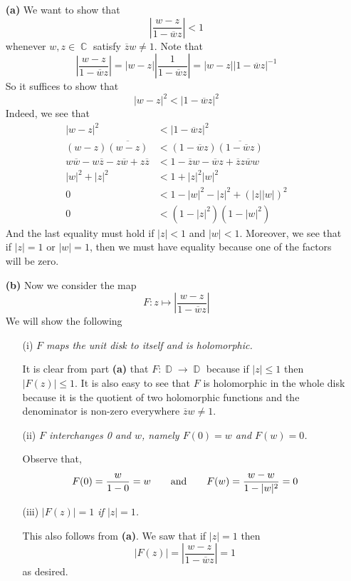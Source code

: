 \documentclass{article}
\newcommand{\tab}{\hspace*{2em}}
\DeclareMathOperator{\C}{\mathbb{C}}
\DeclareMathOperator{\D}{\mathbb{D}}
\newcommand{\exercise}[1]{\noindent{\textbf{Exercise #1:}}}
\newcommand{\conj}[1]{\overline{#1}}
\begin{document}
\exercise{1.4.7}
\begin{enumerate}
\item[\textbf{(a)}] We want to show that
  \[
  \left|\frac{w-z}{1-\conj{w}z}\right| < 1
  \]
  whenever $w,z \in \C$ satisfy $\conj{z}w \neq 1$. Note that
  \[
  \left|\frac{w-z}{1-\conj{w}z}\right| =
  |w-z|\left|\frac{1}{1-\conj{w}z}\right| = |w-z||1-\conj{w}z|^{-1}
  \]
  So it suffices to show that
  \[
  |w-z|^2 < |1-\conj{w}z|^2
  \]
  Indeed, we see that
  \begin{align*}
    |w-z|^2 &< |1-\conj{w}z|^2 \\
    (w-z)\conj{(w-z)} &< (1-\conj{w}z)\conj{(1-\conj{w}z)} \\
    w\conj{w}-w\conj{z}-z\conj{w} + z\conj{z} &<
    1-\conj{z}w-\conj{w}z+\conj{z}z\conj{w}w \\
    |w|^2 + |z|^2 &< 1 + |z|^2|w|^2 \\
    0 &< 1-|w|^2-|z|^2+(|z||w|)^2 \\
    0 &< (1-|z|^2)(1-|w|^2)
  \end{align*}
  And the last equality must hold if $|z| < 1$ and $|w| <
  1$. Moreover, we see that if $|z| = 1$ or $|w| = 1$, then we must
  have equality because one of the factors will be zero.

\item[\textbf{(b)}] Now we consider the map
  \[
  F: z \mapsto \left|\frac{w-z}{1-\conj{w}z}\right|
  \]
  We will show the following
  \begin{enumerate}
  \item[(i)] \textit{$F$ maps the unit disk to itself and is holomorphic.}

    It is clear from part \textbf{(a)} that $F: \D \to \D$ because if
    $|z| \leq 1$ then $|F(z)| \leq 1$. It is also easy to see that
    $F$ is holomorphic in the whole disk because it is the quotient of
    two holomorphic functions and the denominator is non-zero
    everywhere $\conj{z}w \neq 1$.

  \item[(ii)] \textit{$F$ interchanges 0 and $w$, namely $F(0) = w$
      and $F(w)=0$.}

   Observe that,
    \[
    F(0) = \frac{w}{1-0} = w \tab\text{and}\tab F(w) = \frac{w -
      w}{1-|w|^2} = 0
    \]

  \item[(iii)] \textit{$|F(z)| = 1$ if $|z| = 1$.}

    This also follows from \textbf{(a)}. We saw that if $|z| = 1$ then
    \[
    |F(z)| = \left|\frac{w-z}{1-\conj{w}z}\right| = 1
    \]
    as desired.


\end{enumerate}
\end{enumerate}
\end{document}
